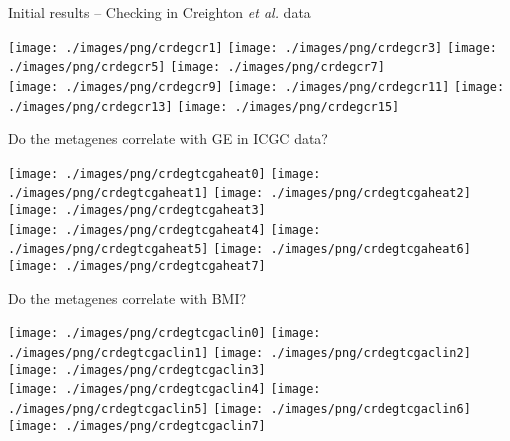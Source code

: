 \documentclass[handout]{beamer}
\begin{document}
\begin{frame}{Initial results -- Checking in Creighton \textit{et al.} data}
	\begin{adjustwidth}{-1.5em}{-1.5em}
		\texttt{[image: ./images/png/crdegcr1]}
		\texttt{[image: ./images/png/crdegcr3]}
		\texttt{[image: ./images/png/crdegcr5]}
		\texttt{[image: ./images/png/crdegcr7]}\\
		\texttt{[image: ./images/png/crdegcr9]}
		\texttt{[image: ./images/png/crdegcr11]}
		\texttt{[image: ./images/png/crdegcr13]}
		\texttt{[image: ./images/png/crdegcr15]}
	\end{adjustwidth}
\end{frame}

\begin{frame}{Do the metagenes correlate with GE in ICGC data?}
	\begin{adjustwidth}{-1.5em}{-1.5em}
		\texttt{[image: ./images/png/crdegtcgaheat0]}
		\texttt{[image: ./images/png/crdegtcgaheat1]}
		\texttt{[image: ./images/png/crdegtcgaheat2]}
		\texttt{[image: ./images/png/crdegtcgaheat3]}\\
		\texttt{[image: ./images/png/crdegtcgaheat4]}
		\texttt{[image: ./images/png/crdegtcgaheat5]}
		\texttt{[image: ./images/png/crdegtcgaheat6]}
		\texttt{[image: ./images/png/crdegtcgaheat7]}
	\end{adjustwidth}
\end{frame}

\begin{frame}{Do the metagenes correlate with BMI?}
	\begin{adjustwidth}{-1.5em}{-1.5em}
		\texttt{[image: ./images/png/crdegtcgaclin0]}
		\texttt{[image: ./images/png/crdegtcgaclin1]}
		\texttt{[image: ./images/png/crdegtcgaclin2]}
		\texttt{[image: ./images/png/crdegtcgaclin3]}\\
		\texttt{[image: ./images/png/crdegtcgaclin4]}
		\texttt{[image: ./images/png/crdegtcgaclin5]}
		\texttt{[image: ./images/png/crdegtcgaclin6]}
		\texttt{[image: ./images/png/crdegtcgaclin7]}
	\end{adjustwidth}
\end{frame}
\end{document}
